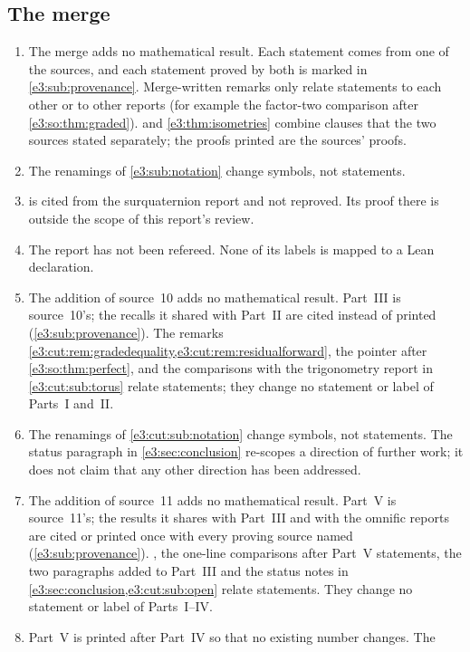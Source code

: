 \documentclass[11pt,letterpaper]{article}
\numberwithin{equation}{section}
\theoremstyle{definition}
\theoremstyle{remark}
\begin{document}
\subsection{The merge}\label{e3:sub:nonclaimsmerge}
\begin{enumerate}[label=\textup{M\arabic*.},leftmargin=2.6em]
\item The merge adds no mathematical result. Each statement comes from one of
 the sources, and each statement proved by both is marked in
 \cref{e3:sub:provenance}. Merge-written remarks only relate statements to
 each other or to other reports (for example the factor-two comparison after
 \cref{e3:so:thm:graded}).  and \cref{e3:thm:isometries}
 combine clauses that the two sources stated separately; the proofs printed
 are the sources' proofs.
\item The renamings of \cref{e3:sub:notation} change symbols, not statements.
\item {} is cited from the surquaternion report and not reproved.
 Its proof there is outside the scope of this report's review.
\item The report has not been refereed. None of its labels is mapped to a Lean
 declaration.
\item The addition of source~10 adds no mathematical result. Part~III is
 source~10's; the recalls it shared with Part~II are cited instead of printed
 (\cref{e3:sub:provenance}). The remarks
 \cref{e3:cut:rem:gradedequality,e3:cut:rem:residualforward}, the pointer after
 \cref{e3:so:thm:perfect}, and the comparisons with the trigonometry report in
 \cref{e3:cut:sub:torus} relate statements; they change no statement or label of
 Parts~I and~II.
\item The renamings of \cref{e3:cut:sub:notation} change symbols, not
 statements. The status paragraph in \cref{e3:sec:conclusion} re-scopes a
 direction of further work; it does not claim that any other direction has been
 addressed.
\item The addition of source~11 adds no mathematical result. Part~V is
 source~11's; the results it shares with Part~III and with the omnific reports
 are cited or printed once with every proving source named
 (\cref{e3:sub:provenance}).
 , the one-line comparisons after
 Part~V statements, the two paragraphs added to Part~III and the status notes in
 \cref{e3:sec:conclusion,e3:cut:sub:open} relate statements. They change no
 statement or label of Parts~I--IV.
\item Part~V is printed after Part~IV so that no existing number changes. The

\end{enumerate}
\end{document}
